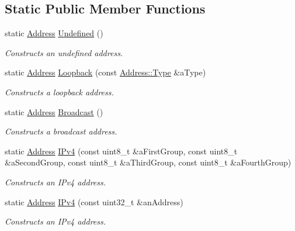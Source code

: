 \subsection*{Static Public Member Functions}
\begin{DoxyCompactItemize}
\item 
static \hyperlink{classostk_1_1io_1_1ip_1_1_address}{Address} \hyperlink{classostk_1_1io_1_1ip_1_1_address_a3e429f06ca69746fb73c155a8a4857b7}{Undefined} ()
\begin{DoxyCompactList}\small\item\em Constructs an undefined address. \end{DoxyCompactList}\item 
static \hyperlink{classostk_1_1io_1_1ip_1_1_address}{Address} \hyperlink{classostk_1_1io_1_1ip_1_1_address_af632da7f131b2a6649d2927ebb6ba60c}{Loopback} (const \hyperlink{classostk_1_1io_1_1ip_1_1_address_a03b78ae8f7ddbb893d7396e6a1baf695}{Address\+::\+Type} \&a\+Type)
\begin{DoxyCompactList}\small\item\em Constructs a loopback address. \end{DoxyCompactList}\item 
static \hyperlink{classostk_1_1io_1_1ip_1_1_address}{Address} \hyperlink{classostk_1_1io_1_1ip_1_1_address_a03652b01913b86e80d8a2a363626849a}{Broadcast} ()
\begin{DoxyCompactList}\small\item\em Constructs a broadcast address. \end{DoxyCompactList}\item 
static \hyperlink{classostk_1_1io_1_1ip_1_1_address}{Address} \hyperlink{classostk_1_1io_1_1ip_1_1_address_a495956892a4815139c94377c0267125d}{I\+Pv4} (const uint8\+\_\+t \&a\+First\+Group, const uint8\+\_\+t \&a\+Second\+Group, const uint8\+\_\+t \&a\+Third\+Group, const uint8\+\_\+t \&a\+Fourth\+Group)
\begin{DoxyCompactList}\small\item\em Constructs an I\+Pv4 address. \end{DoxyCompactList}\item 
static \hyperlink{classostk_1_1io_1_1ip_1_1_address}{Address} \hyperlink{classostk_1_1io_1_1ip_1_1_address_abea1656b0c0edc9af3ba9b51a485a44b}{I\+Pv4} (const uint32\+\_\+t \&an\+Address)
\begin{DoxyCompactList}\small\item\em Constructs an I\+Pv4 address. \end{DoxyCompactList}\item 

\end{DoxyCompactItemize}
